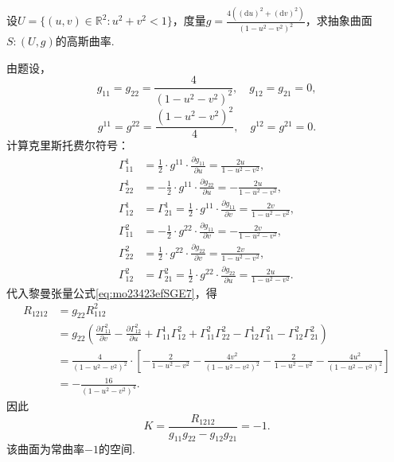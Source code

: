 \documentclass[../../main.tex]{subfiles}%
\begin{document}
\begin{example}
设$U=\{(u,v)\in\mathbb{R}^2:u^2+v^2<1\}$，度量$g=\frac{4\left((\mathrm{d}u)^2+(\mathrm{d}v)^2\right)}{\left(1-u^2-v^2\right)^2}$，求抽象曲面$S:(U,g)$的高斯曲率.
\end{example}
\begin{solution}
由题设，
$$g_{11}=g_{22}=\frac{4}{\left(1-u^2-v^2\right)^2},\quad g_{12}=g_{21}=0,$$
$$g^{11}=g^{22}=\frac{\left(1-u^2-v^2\right)^2}{4},\quad g^{12}=g^{21}=0.$$
计算克里斯托费尔符号：
\begin{align*}
\Gamma^1_{11}&=\frac12\cdot g^{11}\cdot\frac{\partial g_{11}}{\partial u}=\frac{2u}{1-u^2-v^2},\\
\Gamma^1_{22}&=-\frac12\cdot g^{11}\cdot\frac{\partial g_{22}}{\partial u}=-\frac{2u}{1-u^2-v^2},\\
\Gamma^1_{12}&=\Gamma^1_{21}=\frac12\cdot g^{11}\cdot\frac{\partial g_{11}}{\partial v}=\frac{2v}{1-u^2-v^2},\\
\Gamma^2_{11}&=-\frac12\cdot g^{22}\cdot\frac{\partial g_{11}}{\partial v}=-\frac{2v}{1-u^2-v^2},\\
\Gamma^2_{22}&=\frac12\cdot g^{22}\cdot\frac{\partial g_{22}}{\partial v}=\frac{2v}{1-u^2-v^2},\\
\Gamma^2_{12}&=\Gamma^2_{21}=\frac12\cdot g^{22}\cdot\frac{\partial g_{22}}{\partial u}=\frac{2u}{1-u^2-v^2}.
\end{align*}
代入黎曼张量公式\eqref{eq:mo23423efSGE7}，得
\begin{align*}
R_{1212}&=g_{22}R^2_{112}\\
&=g_{22}\left(\frac{\partial\Gamma^2_{11}}{\partial v}-\frac{\partial\Gamma^2_{12}}{\partial u}+\Gamma^1_{11}\Gamma^2_{12}+\Gamma^2_{11}\Gamma^2_{22}-\Gamma^1_{12}\Gamma^2_{11}-\Gamma^2_{12}\Gamma^2_{21}\right)\\
&=\frac{4}{\left(1-u^2-v^2\right)^2}\cdot\left[-\frac{2}{1-u^2-v^2}-\frac{4v^2}{\left(1-u^2-v^2\right)^2}-\frac{2}{1-u^2-v^2}-\frac{4u^2}{\left(1-u^2-v^2\right)^2}\right]\\
&=-\frac{16}{\left(1-u^2-v^2\right)^4}.
\end{align*}
因此
$$K=\frac{R_{1212}}{g_{11}g_{22}-g_{12}g_{21}}=-1.$$
该曲面为常曲率$-1$的空间.

\end{solution}
\end{document}
